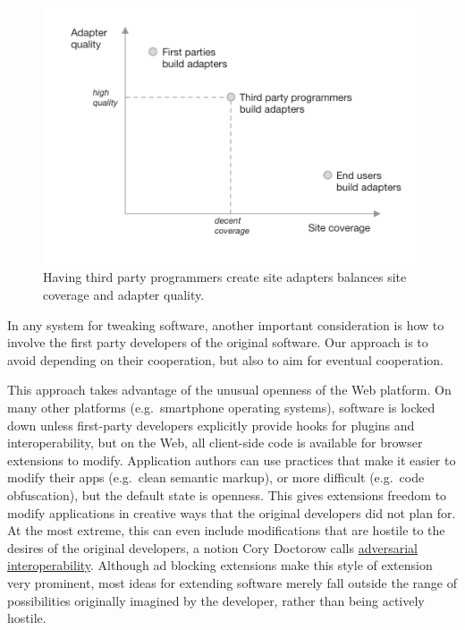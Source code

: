 \documentclass[english,submission]{programming}
\begin{document}
\begin{figure}
\centering
\includegraphics{media/adapters.png}
\caption{Having third party programmers create site adapters balances
site coverage and adapter quality.}
\end{figure}

In any system for tweaking software, another important consideration is
how to involve the first party developers of the original software. Our
approach is to avoid depending on their cooperation, but also to aim for
eventual cooperation.

This approach takes advantage of the unusual openness of the Web
platform. On many other platforms (e.g.~smartphone operating systems),
software is locked down unless first-party developers explicitly provide
hooks for plugins and interoperability, but on the Web, all client-side
code is available for browser extensions to modify. Application authors
can use practices that make it easier to modify their apps (e.g.~clean
semantic markup), or more difficult (e.g.~code obfuscation), but the
default state is openness. This gives extensions freedom to modify
applications in creative ways that the original developers did not plan
for. At the most extreme, this can even include modifications that are
hostile to the desires of the original developers, a notion Cory
Doctorow calls
\href{https://www.eff.org/deeplinks/2019/10/adversarial-interoperability/}{adversarial
interoperability}. Although ad blocking extensions make this style of
extension very prominent, most ideas for extending software merely fall
outside the range of possibilities originally imagined by the developer,
rather than being actively hostile.
\end{document}
